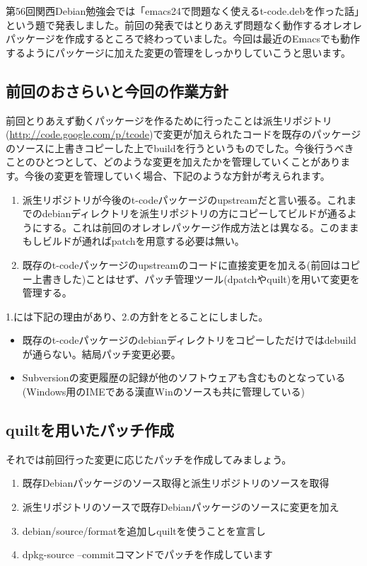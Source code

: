 \documentclass[mingoth,a4paper]{jsarticle}
\begin{document}
\clearpage
{}

第56回関西Debian勉強会では「emacs24で問題なく使えるt-code.debを作った話」という題で発表しました。前回の発表ではとりあえず問題なく動作するオレオレパッケージを作成するところで終わっていました。今回は最近のEmacsでも動作するようにパッケージに加えた変更の管理をしっかりしていこうと思います。

\subsection{前回のおさらいと今回の作業方針}
前回とりあえず動くパッケージを作るために行ったことは派生リポジトリ(\url{http://code.google.com/p/tcode})で変更が加えられたコードを既存のパッケージのソースに上書きコピーした上でbuildを行うというものでした。今後行うべきことのひとつとして、どのような変更を加えたかを管理していくことがあります。今後の変更を管理していく場合、下記のような方針が考えられます。

\begin{enumerate}
\item 派生リポジトリが今後のt-codeパッケージのupstreamだと言い張る。これまでのdebianディレクトリを派生リポジトリの方にコピーしてビルドが通るようにする。これは前回のオレオレパッケージ作成方法とは異なる。このままもしビルドが通ればpatchを用意する必要は無い。
\item 既存のt-codeパッケージのupstreamのコードに直接変更を加える(前回はコピー上書きした)ことはせず、パッチ管理ツール(dpatchやquilt)を用いて変更を管理する。
\end{enumerate}

1.には下記の理由があり、2.の方針をとることにしました。

\begin{itemize}
\item 既存のt-codeパッケージのdebianディレクトリをコピーしただけではdebuildが通らない。結局パッチ変更必要。
\item Subversionの変更履歴の記録が他のソフトウェアも含むものとなっている(Windows用のIMEである漢直Winのソースも共に管理している)
\end{itemize}

\subsection{quiltを用いたパッチ作成}

それでは前回行った変更に応じたパッチを作成してみましょう。

\begin{enumerate}
\item 既存Debianパッケージのソース取得と派生リポジトリのソースを取得
\item 派生リポジトリのソースで既存Debianパッケージのソースに変更を加え
\item debian/source/formatを追加しquiltを使うことを宣言し
\item dpkg-source --commitコマンドでパッチを作成しています
\end{enumerate}
\end{document}
